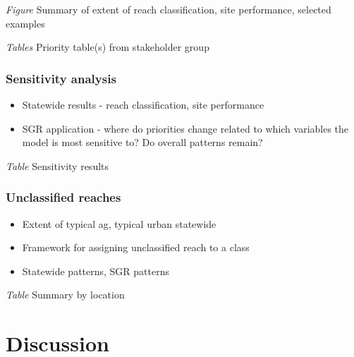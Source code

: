 \documentclass[]{article}
\begin{document}
\emph{Figure} Summary of extent of reach classification, site
performance, selected examples

\emph{Tables} Priority table(s) from stakeholder group

\subsubsection{Sensitivity analysis}\label{sensitivity-analysis}

\begin{itemize}
\item
  Statewide results - reach classification, site performance
\item
  SGR application - where do priorities change related to which
  variables the model is most sensitive to? Do overall patterns remain?
\end{itemize}

\emph{Table} Sensitivity results

\subsubsection{Unclassified reaches}\label{unclassified-reaches-1}

\begin{itemize}
\item
  Extent of typical ag, typical urban statewide
\item
  Framework for assigning unclassified reach to a class
\item
  Statewide patterns, SGR patterns
\end{itemize}

\emph{Table} Summary by location

\section{Discussion}\label{discussion}
\end{document}
